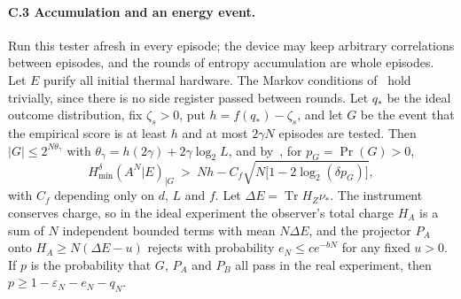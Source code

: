 \documentclass[11pt]{article}
\theoremstyle{definition}
\theoremstyle{remark}
\newcommand{\Tr}{\operatorname{Tr}}
\begin{document}
\paragraph{C.3 Accumulation and an energy event.} Run this tester afresh in every episode; the device may keep arbitrary correlations between episodes, and the rounds of entropy accumulation are whole episodes. Let $E$ purify all initial thermal hardware. The Markov conditions of~\cite{DFR20} hold trivially, since there is no side register passed between rounds. Let $q_*$ be the ideal outcome distribution, fix $\zeta_s>0$, put $h=f(q_*)-\zeta_s$, and let $G$ be the event that the empirical score is at least $h$ and at most $2\gamma N$ episodes are tested. Then $|G|\le2^{N\theta_\gamma}$ with $\theta_\gamma=h(2\gamma)+2\gamma\log_2L$, and by~\cite[Thm.~4.4]{DFR20}, for $p_G=\Pr(G)>0$,
\begin{equation}\label{eq:eat}
H_{\min}^\delta(A^N|E)_{|G}\ >\ Nh-C_f\sqrt{N\bigl[1-2\log_2(\delta p_G)\bigr]},
\end{equation}
with $C_f$ depending only on $d$, $L$ and $f$. Let $\Delta E=\Tr H_Z\nu_*$. The instrument conserves charge, so in the ideal experiment the observer's total charge $H_A$ is a sum of $N$ independent bounded terms with mean $N\Delta E$, and the projector $P_A$ onto $H_A\ge N(\Delta E-u)$ rejects with probability $e_N\le ce^{-bN}$ for any fixed $u>0$. If $p$ is the probability that $G$, $P_A$ and $P_B$ all pass in the real experiment, then $p\ge1-\varepsilon_N-e_N-q_N$.
\end{document}
